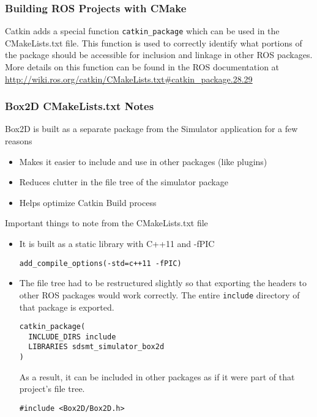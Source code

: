 \subsubsection*{Building ROS Projects with CMake}
Catkin adds a special function \lstinline|catkin_package| which can be used in the CMakeLists.txt file. This function is used to correctly identify what portions of the package should be accessible for inclusion and linkage in other ROS packages. More details on this function can be found in the ROS documentation at \url{http://wiki.ros.org/catkin/CMakeLists.txt#catkin_package.28.29}
\subsubsection*{Box2D CMakeLists.txt Notes}
Box2D is built as a separate package from the Simulator application for a few reasons
\begin{itemize}
	\item Makes it easier to include and use in other packages (like plugins)
	\item Reduces clutter in the file tree of the simulator package
	\item Helps optimize Catkin Build process
\end{itemize}

Important things to note from the CMakeLists.txt file
\begin{itemize}
	\item It is built as a static library with C++11 and -fPIC
	\begin{lstlisting}
add_compile_options(-std=c++11 -fPIC)
	\end{lstlisting}
	\item The file tree had to be restructured slightly so that exporting the headers to other ROS packages would work correctly. The entire \lstinline|include| directory of that package is exported.

	\begin{lstlisting}
catkin_package(
  INCLUDE_DIRS include
  LIBRARIES sdsmt_simulator_box2d
)
	\end{lstlisting}
	As a result, it can be included in other packages as if it were part of that project's file tree.
	\begin{lstlisting}
#include <Box2D/Box2D.h>
	\end{lstlisting}
\end{itemize}
